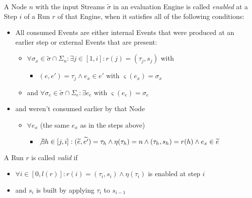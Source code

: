 \begin{definition}[name = Enabledness of a Node]\label{def:node_enabled}
  A Node \(n\) with the input Streams \(\widetilde{\sigma}\) in an evaluation Engine is called \emph{enabled} at a Step \(i\) of a Run \(r\) of that Engine, when it satisfies all of the following conditions:

  \begin{itemize}
    \item All consumed Events are either internal Events that were produced at an earlier step or external Events that are present:
      \begin{itemize}
        \item \(\forall \sigma_x \in \widetilde{\sigma} \cap \Sigma_n: \exists j \in [1, i]: r(j) = (\tau_j, s_j)\) with
          \begin{itemize}
            \item\( (e, e') = \tau_j \land e_x \in e'\) with \(\varsigma(e_x) = \sigma_x \)
          \end{itemize}
        \item and \(\forall \sigma_e \in \widetilde{\sigma} \cap\Sigma_e:\exists e_e\) with \(\varsigma(e_e) = \sigma_e\)
      \end{itemize}
    \item and weren't consumed earlier by that Node
      \begin{itemize}
        \item \(\forall e_x\) (the same \(e_x\) as in the steps above)
          \begin{itemize}
            \item \(\not\exists h \in [j, i]: (\widetilde{e}, \widetilde{e'}) = \tau_h \land \eta(\tau_h) = n \land (\tau_h, s_h) = r(h) \land e_x \in \widetilde{e}\)
          \end{itemize}
      \end{itemize}
  \end{itemize}
\end{definition}

\begin{definition}[name = Valid Run]\label{def:valid_run}
  A Run \(r\) is called \emph{valid} if
  \begin{itemize}
    \item \(\forall i \in [0,l(r)]: r(i) = (\tau_i,s_i) \land \eta(\tau_i)\) is enabled at step \(i\)
    \item and \(s_i\) is built by applying \(\tau_i\) to \(s_{i-1}\)
  \end{itemize}
\end{definition}


